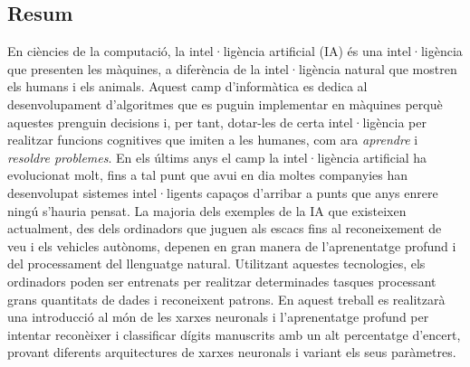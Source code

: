 \begin{otherlanguage}{catalan}

	\chapter*{Resum}
	\setcounter{chapter}{-3}

	En ciències de la computació, la intel·ligència artificial (IA) és una intel·ligència que presenten les màquines, a diferència de la intel·ligència natural que mostren els humans i els animals. Aquest camp d’informàtica es dedica al desenvolupament d’algoritmes que es puguin implementar en màquines perquè aquestes prenguin decisions i, per tant, dotar-les de certa intel·ligència per realitzar funcions cognitives que imiten a les humanes, com ara \textit{aprendre} i \textit{resoldre problemes}. En els últims anys el camp la intel·ligència artificial ha evolucionat molt, fins a tal punt que avui en dia moltes companyies han desenvolupat sistemes intel·ligents capaços d'arribar a punts que anys enrere ningú s'hauria pensat. La majoria dels exemples de la IA que existeixen actualment, des dels ordinadors que juguen als escacs fins al reconeixement de veu i els vehicles autònoms, depenen en gran manera de l’aprenentatge profund i del processament del llenguatge natural. Utilitzant aquestes tecnologies, els ordinadors poden ser entrenats per realitzar determinades tasques processant grans quantitats de dades i reconeixent patrons. En aquest treball es realitzarà una introducció al món de les xarxes neuronals i l'aprenentatge profund per intentar reconèixer i classificar dígits manuscrits amb un alt percentatge d'encert, provant diferents arquitectures de xarxes neuronals i variant els seus paràmetres.

\end{otherlanguage}

\newpage

